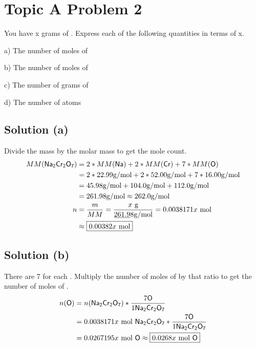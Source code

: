 \documentclass[10pt]{article}
\begin{document}
    \pagebreak
    \section{Topic A Problem 2}
        You have x grams of . 
        Express each of the following quantities in terms of x.

        a) The number of moles of 

        b) The number of moles of 

        c) The number of grams of 

        d) The number of  atoms

        \subsection{Solution (a)}
            Divide the mass by the molar mass to get the mole count.
            \begin{align}
                MM(\ce{Na2Cr2O7})   &=  2 * MM(\ce{Na}) + 2 * MM(\ce{Cr}) + 7 * MM(\ce{O})\\
                    &=  2 * 22.99 \unit{\gram/\mole} + 2 * 52.00 \unit{\gram/\mole} + 7 * 16.00 \unit{\gram/\mole}\\
                    &=  45.98 \unit{\gram/\mole} + 104.0 \unit{\gram/\mole} + 112.0 \unit{\gram/\mole}\\
                    &=  261.98 \unit{\gram/\mole} \approx 262.0 \unit{\gram/\mole}\\
                n   &=  \frac{m}{MM}
                    =   \frac{x\ \unit{\gram}}{\underbar{261.9}8 \unit{\gram/\mole}}
                    =   0.0038171x\ \unit{\mole}\\
                    &\approx    \boxed{0.00382x\ \unit{\mole}}
            \end{align}

        \subsection{Solution (b)}
            There are 7  for each .
            Multiply the number of moles of  by that ratio to get the number of moles of .
            \begin{align}
                n(\ce{O})   &=  n(\ce{Na2Cr2O7}) * \frac{7 \ce{O}}{1 \ce{Na2Cr2O7}}\\
                    &=  0.0038171x\ \unit{\mole}\ \ce{Na2Cr2O7} * \frac{7 \ce{O}}{1 \ce{Na2Cr2O7}}\\
                    &=  0.0267195x\ \unit{\mole}\ \ce{O}
                    \approx \boxed{0.0268x\ \unit{\mole}\ \ce{O}}
            \end{align}
        
\end{document}

